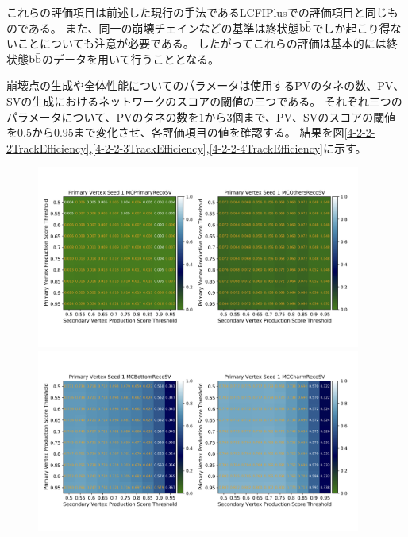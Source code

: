 これらの評価項目は前述した現行の手法であるLCFIPlusでの評価項目と同じものである。
また、同一の崩壊チェインなどの基準は終状態$\rm b\bar{b}$でしか起こり得ないことについても注意が必要である。
したがってこれらの評価は基本的には終状態$\rm b\bar{b}$のデータを用いて行うこととなる。

崩壊点の生成や全体性能についてのパラメータは使用するPVのタネの数、PV、SVの生成におけるネットワークのスコアの閾値の三つである。
それぞれ三つのパラメータについて、PVのタネの数を$1$から$3$個まで、PV、SVのスコアの閾値を$0.5$から$0.95$まで変化させ、各評価項目の値を確認する。
結果を図\ref{4-2-2-2TrackEfficiency},\ref{4-2-2-3TrackEfficiency},\ref{4-2-2-4TrackEfficiency}に示す。

\begin{figure}[htbp]
 \centering
  \begin{minipage}{1.0\textwidth}
   \centering
    \includegraphics[trim = 0 140 0 140, width=0.95\textwidth, clip]{Figure/4VertexFinderwithDL/4-2-2-2TrackEfficiencyPVOthers.png}
   \end{minipage}
   
   \begin{minipage}{1.0\textwidth}
   \centering
    \includegraphics[trim = 0 140 0 140, width=0.95\textwidth, clip]{Figure/4VertexFinderwithDL/4-2-2-2TrackEfficiencyBottomCharm.png}
   \end{minipage}
   

\end{figure}

